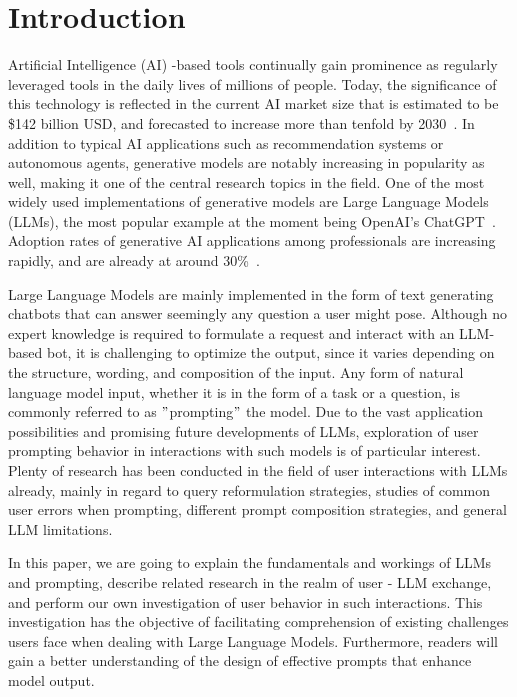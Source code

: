 \section{Introduction}
\label{sec:introduction}

\sloppy %
Artificial Intelligence (AI) -based tools continually gain prominence as regularly leveraged tools in the
daily lives of millions of people.
Today, the significance of this technology is reflected in the current AI market size that is
estimated to be \$142 billion USD, and forecasted to increase more than tenfold by 2030~\cite{statista_artificial_2023}.
In addition to typical AI applications such as recommendation systems or autonomous agents, generative
models are notably increasing in popularity as well, making it one of the central research topics
in the field.
One of the most widely used implementations of generative models are Large Language Models (LLMs),
the most popular example at the moment being OpenAI's ChatGPT~\cite{openai_chatgpt_2023}.
Adoption rates of generative AI applications among professionals are increasing rapidly, and are
already at
around 30\%~\cite{statista_us_2022}.

Large Language Models are mainly implemented in the form of text generating chatbots that can
answer seemingly any question a user might pose.
Although no expert knowledge is required to formulate a request and interact with an LLM-based bot, it is challenging to optimize the output, since it varies depending on the structure, wording,
and composition of the input. %
Any form of natural language model input, whether it is in the form of a task or a question, is
commonly referred to as \("\)prompting\("\) the model.
Due to the vast application possibilities and promising future developments of LLMs, exploration of
user prompting behavior in interactions with such models is of particular interest.
Plenty of research has been conducted in the field of user interactions with LLMs already,
mainly in regard to query reformulation strategies, studies of common user errors when prompting,
different prompt composition strategies, and general LLM limitations.

In this paper, we are going to explain the fundamentals and workings of LLMs and prompting,
describe related research in the realm of user - LLM exchange, and perform our own investigation of
user behavior in such interactions.
This investigation has the objective of facilitating comprehension of existing challenges users
face when dealing with Large Language Models.
Furthermore, readers will gain a better understanding of the design of effective prompts that
enhance model output.

